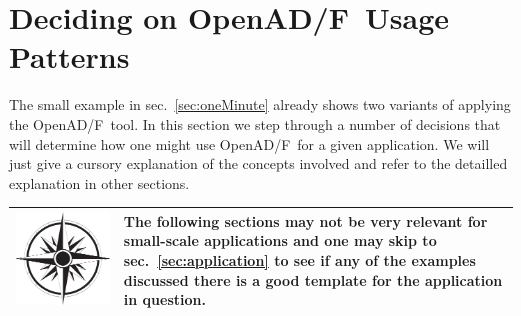 \documentclass{book}
\newcommand{\OpenADF}{OpenAD/F}
\newcommand{\refsec}[1]{{sec.~\ref{#1}}}
\newcommand{\nav}[1]{
\begin{tabular}{|m{.03\textwidth}|m{.92\textwidth}|}\hline
\vspace{1mm}
\includegraphics[width=.03\textwidth]{windrose_zh1}&
\vspace{1mm}
\begin{minipage}[c]{.86\textwidth}
\small {#1}
\end{minipage}
\vspace{1mm}
\\\hline
\end{tabular}
}
\begin{document}
\section{Deciding on \OpenADF\ Usage Patterns}\label{sec:deciding}

The small example in \refsec{sec:oneMinute} already shows two variants of applying the \OpenADF\ tool. 
In this section we step through a number of decisions that will determine how one might use 
\OpenADF\ for a given application. We will just give a cursory explanation of the 
concepts involved and refer to the detailled explanation in other sections.\\ 
\nav{The following sections may not be very relevant for small-scale applications 
and one may skip 
to \refsec{sec:application} to see if any of the examples discussed there is a good template for 
the application in question.}

\end{document}

